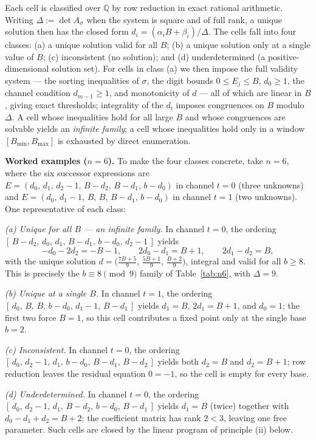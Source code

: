 \documentclass[11pt]{amsart}
\theoremstyle{definition}
\begin{document}
Each cell is classified over $\mathbb{Q}$ by row reduction in exact
rational arithmetic. Writing $\Delta:=\det A_\sigma$ when the system is
square and of full rank, a unique solution then has the closed form
$d_i=(\alpha_i B+\beta_i)/\Delta$. The cells fall into four classes:
(a) a unique solution valid for all $B$; (b) a unique solution only at a
single value of $B$; (c) inconsistent (no solution); and (d)
underdetermined (a positive-dimensional solution set). For cells in
class (a) we then impose the full validity system --- the sorting
inequalities of $\sigma$, the digit bounds $0\le E_j\le B$, $d_0\ge 1$,
the channel condition $d_{m-1}\ge 1$, and monotonicity of $d$ --- all of
which are linear in $B$, giving exact thresholds; integrality of the
$d_i$ imposes congruences on $B$ modulo $\Delta$. A cell whose
inequalities hold for all large $B$ and whose congruences are solvable
yields an \emph{infinite family}; a cell whose inequalities hold only in
a window $[B_{\min},B_{\max}]$ is exhausted by direct enumeration.

\smallskip
\noindent\textbf{Worked examples ($n=6$).} To make the four classes
concrete, take $n=6$, where the six successor expressions are
$E=(d_0,\,d_1,\,d_2-1,\,B-d_2,\,B-d_1,\,b-d_0)$ in channel $t=0$ (three
unknowns) and $E=(d_0,\,d_1-1,\,B,\,B,\,B-d_1,\,b-d_0)$ in channel $t=1$
(two unknowns). One representative of each class:

\emph{(a) Unique for all $B$ --- an infinite family.} In channel $t=0$,
the ordering $[\,B-d_2,\,d_0,\,d_1,\,B-d_1,\,b-d_0,\,d_2-1\,]$ yields
\[
-d_0-2d_2=-B-1,\qquad 2d_0-d_1=B+1,\qquad 2d_1-d_2=B,
\]
with the unique solution
$d=\bigl(\tfrac{7B+5}{9},\,\tfrac{5B+1}{9},\,\tfrac{B+2}{9}\bigr)$,
integral and valid for all $b\ge 8$. This is precisely the
$b\equiv 8\pmod 9$ family of Table~\ref{tab:n6}, with $\Delta=9$.

\emph{(b) Unique at a single $B$.} In channel $t=1$, the ordering
$[\,d_0,\,B,\,B,\,b-d_0,\,d_1-1,\,B-d_1\,]$ yields $d_1=B$, $2d_1=B+1$,
and $d_0=1$; the first two force $B=1$, so this cell contributes a fixed
point only at the single base $b=2$.

\emph{(c) Inconsistent.} In channel $t=0$, the ordering
$[\,d_0,\,d_2-1,\,d_1,\,b-d_0,\,B-d_1,\,B-d_2\,]$ yields both $d_2=B$ and
$d_2=B+1$; row reduction leaves the residual equation $0=-1$, so the
cell is empty for every base.

\emph{(d) Underdetermined.} In channel $t=0$, the ordering
$[\,d_0,\,d_2-1,\,d_1,\,B-d_2,\,b-d_0,\,B-d_1\,]$ yields $d_1=B$ (twice)
together with $d_0-d_1+d_2=B+2$; the coefficient matrix has rank $2<3$,
leaving one free parameter. Such cells are closed by the linear program
of principle (ii) below.
\end{document}
